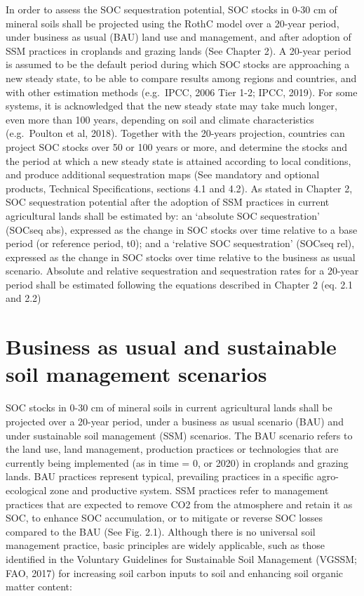 \documentclass[
  10pt,
  b5paper,
]{book}
\begin{document}
In order to assess the SOC sequestration potential, SOC stocks in 0-30 cm of mineral soils shall be projected using the RothC model over a 20-year period, under business as usual (BAU) land use and management, and after adoption of SSM practices in croplands and grazing lands (See Chapter 2). A 20-year period is assumed to be the default period during which SOC stocks are approaching a new steady state, to be able to compare results among regions and countries, and with other estimation methods (e.g.~IPCC, 2006 Tier 1-2; IPCC, 2019). For some systems, it is acknowledged that the new steady state may take much longer, even more than 100 years, depending on soil and climate characteristics (e.g.~Poulton et al, 2018). Together with the 20-years projection, countries can project SOC stocks over 50 or 100 years or more, and determine the stocks and the period at which a new steady state is attained according to local conditions, and produce additional sequestration maps (See mandatory and optional products, Technical Specifications, sections 4.1 and 4.2).
As stated in Chapter 2, SOC sequestration potential after the adoption of SSM practices in current agricultural lands shall be estimated by: an `absolute SOC sequestration' (SOCseq abs), expressed as the change in SOC stocks over time relative to a base period (or reference period, t0); and a `relative SOC sequestration' (SOCseq rel), expressed as the change in SOC stocks over time relative to the business as usual scenario. Absolute and relative sequestration and sequestration rates for a 20-year period shall be estimated following the equations described in Chapter 2 (eq. 2.1 and 2.2)

\hypertarget{business-as-usual-and-sustainable-soil-management-scenarios}{%
\section{Business as usual and sustainable soil management scenarios}\label{business-as-usual-and-sustainable-soil-management-scenarios}}

SOC stocks in 0-30 cm of mineral soils in current agricultural lands shall be projected over a 20-year period, under a business as usual scenario (BAU) and under sustainable soil management (SSM) scenarios. The BAU scenario refers to the land use, land management, production practices or technologies that are currently being implemented (as in time = 0, or 2020) in croplands and grazing lands. BAU practices represent typical, prevailing practices in a specific agro-ecological zone and productive system. SSM practices refer to management practices that are expected to remove CO2 from the atmosphere and retain it as SOC, to enhance SOC accumulation, or to mitigate or reverse SOC losses compared to the BAU (See Fig. 2.1). Although there is no universal soil management practice, basic principles are widely applicable, such as those identified in the Voluntary Guidelines for Sustainable Soil Management (VGSSM; FAO, 2017) for increasing soil carbon inputs to soil and enhancing soil organic matter content:
\end{document}
